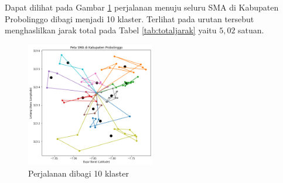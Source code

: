 Dapat dilihat pada Gambar \ref{fig:hasil_mtsp10} perjalanan menuju seluru SMA di Kabupaten Probolinggo dibagi menjadi 10 klaster. Terlihat pada urutan tersebut menghaslilkan jarak total pada Tabel \ref{tab:totaljarak} yaitu $5,02$ satuan.

\begin{figure}[H]
\centering
\includegraphics[width=0.5\textwidth]{Gambar/hasil_mtsp/10}
\caption{Perjalanan dibagi 10 klaster}
\label{fig:hasil_mtsp10}
\end{figure}

